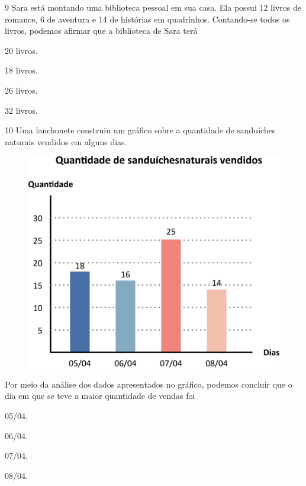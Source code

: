 \num{9} Sara está montando uma biblioteca pessoal em sua casa. Ela possui 12 livros de romance, 6 de aventura e 14 de histórias em quadrinhos. Contando-se todos os livros, podemos afirmar que a biblioteca de Sara terá

\begin{escolha}
\item
  20 livros.
\item
  18 livros.
\item
  26 livros.
\item
  32 livros.
\end{escolha}

\num{10} Uma lanchonete construiu um gráfico sobre a quantidade de sanduíches
naturais vendidos em alguns dias.

\begin{figure}[htpb!]
\centering
\includegraphics[width=\textwidth]{./media/image109.png}
\end{figure}

Por meio da análise dos dados apresentados no gráfico, podemos concluir que o dia em que se teve a maior quantidade de vendas foi

\begin{escolha}
\item
  05/04.
\item
  06/04.
\item
  07/04.
\item
  08/04.
\end{escolha}


